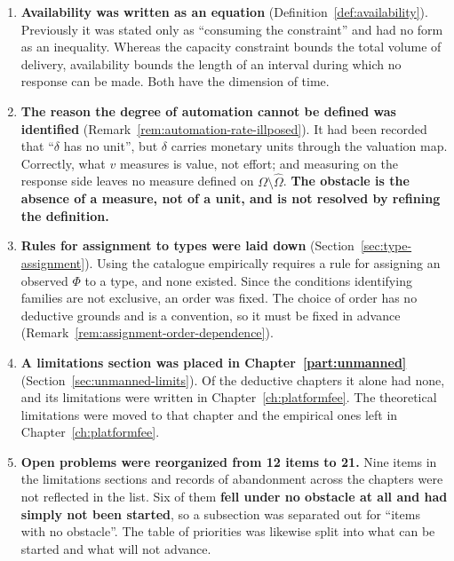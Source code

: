 \begin{enumerate}[label=(\arabic*)]
\item \textbf{Availability was written as an equation} (Definition~\ref{def:availability}).
Previously it was stated only as ``consuming the constraint'' and had no form as an inequality.
Whereas the capacity constraint bounds the total volume of delivery, availability bounds the length
of an interval during which no response can be made. Both have the dimension of time.

\item \textbf{The reason the degree of automation cannot be defined was identified}
(Remark~\ref{rem:automation-rate-illposed}). It had been recorded that ``$\delta$ has no unit'',
but $\delta$ carries monetary units through the valuation map. Correctly, what $v$ measures is
value, not effort; and measuring on the response side leaves no measure defined on
$\Omega\setminus\hat\Omega$. \textbf{The obstacle is the absence of a measure, not of a unit, and
is not resolved by refining the definition.}

\item \textbf{Rules for assignment to types were laid down}
(Section~\ref{sec:type-assignment}). Using the catalogue empirically requires a rule for assigning
an observed $\Phi$ to a type, and none existed. Since the conditions identifying families are not
exclusive, an order was fixed. The choice of order has no deductive grounds and is a convention, so
it must be fixed in advance (Remark~\ref{rem:assignment-order-dependence}).

\item \textbf{A limitations section was placed in Chapter~\ref{part:unmanned}}
(Section~\ref{sec:unmanned-limits}). Of the deductive chapters it alone had none, and its
limitations were written in Chapter~\ref{ch:platformfee}. The theoretical limitations were moved to
that chapter and the empirical ones left in Chapter~\ref{ch:platformfee}.

\item \textbf{Open problems were reorganized from 12 items to 21.} Nine items in the limitations
sections and records of abandonment across the chapters were not reflected in the list. Six of them
\textbf{fell under no obstacle at all and had simply not been started}, so a subsection was
separated out for ``items with no obstacle''. The table of priorities was likewise split into what
can be started and what will not advance.
\end{enumerate}

